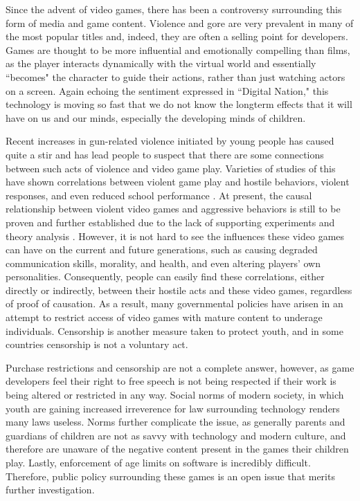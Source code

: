 

\indent\indent Since the advent of video games, there has been a controversy surrounding this form of media and game content. Violence and gore are very prevalent in many of the most popular titles and, indeed, they are often a selling point for developers. Games are thought to be more influential and emotionally compelling than films, as the player interacts dynamically with the virtual world and essentially ``becomes" the character to guide their actions, rather than just watching actors on a screen. Again echoing the sentiment expressed in ``Digital Nation," this technology is moving so fast that we do not know the longterm effects that it will have on us and our minds, especially the developing minds of children.

Recent increases in gun-related violence initiated by young people has caused quite a stir and has lead people to suspect that there are some connections between such acts of violence and video game play. Varieties of studies of this have shown correlations between violent game play and hostile behaviors, violent responses, and even reduced school performance \cite{barlett2009, gentile2004, anderson2003}. At present, the causal relationship between violent video games and aggressive behaviors is still to be proven and further established due to the lack of supporting experiments and theory analysis \cite{ferguson2013, ferguson2008,makuch2013,markey2014}. However, it is not hard to see the influences these video games can have on the current and future generations, such as causing degraded communication skills, morality, and health, and even altering players' own personalities. Consequently, people can easily find these correlations, either directly or indirectly, between their hostile acts and these video games, regardless of proof of causation. As a result, many governmental policies have arisen in an attempt to restrict access of video games with mature content to underage individuals. Censorship is another measure taken to protect youth, and in some countries censorship is not a voluntary act.

Purchase restrictions and censorship are not a complete answer, however, as game developers feel their right to free speech is not being respected if their work is being altered or restricted in any way. Social norms of modern society, in which youth are gaining increased irreverence for law surrounding technology renders many laws useless. Norms further complicate the issue, as generally parents and guardians of children are not as savvy with technology and modern culture, and therefore are unaware of the negative content present in the games their children play. Lastly, enforcement of age limits on software is incredibly difficult. Therefore, public policy surrounding these games is an open issue that merits further investigation.

